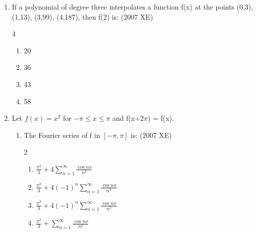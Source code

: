 \begin{enumerate}[label=\thesubsection.\arabic*,ref=\thesubsection.\theenumi]
    \item If a polynomial of degree three interpolates a function f(x) at the points (0,3), (1,13), (3,99), (4,187), then f(2) is:
    \hfill{(2007 XE)}
    \begin{multicols}{4}
    \begin{enumerate}
        \item 20
        \item 36
        \item 43
        \item 58
    \end{enumerate}
\end{multicols}
    \item Let $f(x) = x^2$ for $-\pi \leq x \leq \pi$ and f(x+2$\pi$) = f(x). 
    \begin{enumerate}
    \item The Fourier series of f in $[-\pi,\pi]$ is:
    \hfill{(2007 XE)}
    \begin{multicols}{2}
    \begin{enumerate}
        \item $\frac{\pi^2}{3} + 4 \sum_{n=1}^{\infty} \frac{\cos nx}{n^2}$
        \item $\frac{\pi^2}{3} + 4 (-1)^n \sum_{n=1}^{\infty} \frac{\cos nx}{n^2}$       
        \item $\frac{\pi^2}{3} + 4 (-1)^n \sum_{n=1}^{\infty} \frac{\cos nx}{n^2}$
        \item $\frac{\pi^2}{3} + \sum_{n=1}^{\infty} \frac{\cos nx}{n^2}$
    \end{enumerate}
\end{multicols}


\end{enumerate}
\end{enumerate}
